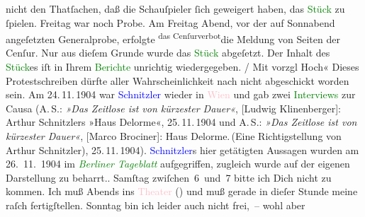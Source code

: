 {{{                        nicht den Thatſachen, daß die Schauſpieler ſich geweigert haben,  das \textcolor{green}{Stück} zu ſpielen. Freitag war noch Probe.  Am Freitag{ }Abend, vor der auf Sonnabend
                        angeſetzten Generalprobe, \strikeout{\textcolor{gray}{er}} erfolgte \substVorne{}\textsuperscript{das Cenſurverbot}{\allowbreak}\substDazwischen{}die Meldung von Seiten der Cenſur\substHinten{}. Nur aus dieſem Grunde wurde das \textcolor{green}{Stück} abgeſetzt. Der Inhalt des \textcolor{green}{Stück}es iſt in  Ihrem \textcolor{green}{Berichte} unrichtig wiedergegeben.{ / }Mit vorzgl Hoch« Dieses Protestschreiben dürfte aller Wahrscheinlichkeit nach nicht
                     abgeschickt worden sein. Am 24. 11. 1904 war \textcolor{blue}{Schnitzler} wieder
                     in \textcolor{pink}{Wien} und gab zwei \textcolor{green}{Interviews} zur Causa (A. S.: \emph{»Das Zeitlose ist von kürzester Dauer«}, [Ludwig Klinenberger]: Arthur Schnitzlers »Haus Delorme«, 25. 11. 1904 und A. S.: \emph{»Das Zeitlose ist von kürzester Dauer«}, [Marco Brociner]: Haus Delorme. (Eine Richtigstellung von Arthur Schnitzler), 25. 11. 1904). \textcolor{blue}{Schnitzler}s 
                     hier getätigten Aussagen wurden am
                     26. 11. 1904 im \emph{\textcolor{green}{Berliner
                        Tageblatt}} aufgegriffen, zugleich wurde auf der eigenen Darstellung zu
                  beharrt.}}}\label{K_L03456-1h}. Samſtag{ }zwiſchen 6 und 7 bitte ich Dich nicht zu kommen. Ich muß
                  Abends ins \textcolor{pink}{Theater}{}\ledrightnote{{$\rightarrow$}\textcolor{pink}{Lessing-Theater}} (\label{K_L03456-2v}\label{K_L03456-2h}) und muß gerade in dieſer Stunde
               meine \label{K_L03456-3v}\label{K_L03456-3h} raſch fertigſtellen. {\pb}Sonntag bin ich leider auch nicht frei, – wohl aber
